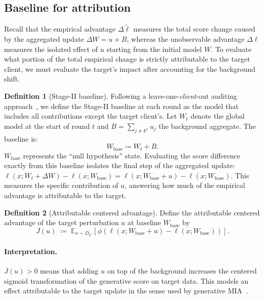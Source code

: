 \documentclass{article}
\theoremstyle{plain}
\theoremstyle{definition}
\newtheorem{definition}{Definition}
\theoremstyle{remark}
\numberwithin{theorem}{section}
\numberwithin{definition}{section}
\numberwithin{remark}{section}
\numberwithin{lemma}{section}
\numberwithin{assumption}{section}
\newcommand{\E}{\mathbb{E}}
\newcommand{\tindex}{k^\star}
\newcommand{\utarget}{u}
\begin{document}
\subsection{Baseline for attribution}

Recall that the empirical advantage $\Delta\tilde\ell$ measures the total score change caused by the aggregated update $\Delta W = \utarget + B$, whereas the unobservable advantage $\Delta\ell$ measures the isolated effect of $\utarget$ starting from the initial model $W$.
To evaluate what portion of the total empirical change is strictly attributable to the target client, we must evaluate the target's impact after accounting for the background shift.

\begin{definition}[Stage-II baseline]
\label{def:Wbase}
Following a leave-one-\emph{client}-out auditing approach~\cite{carlini2022membership}, we define the Stage-II baseline at each round as the model that includes all contributions except the target client's. Let $W_t$ denote the global model at the start of round $t$ and $B = \sum_{j \neq \tindex} u_j$ the background aggregate. The baseline is:
\begin{equation}
\label{eq:Wbase}
W_{\mathrm{base}} \coloneqq W_t + B.
\end{equation}
$W_{\mathrm{base}}$ represents the ``null hypothesis'' state. Evaluating the score difference exactly from this baseline isolates the final step of the aggregated update:
$ \ell(x; W_t + \Delta W) - \ell(x; W_{\mathrm{base}}) = \ell(x; W_{\mathrm{base}} + \utarget) - \ell(x; W_{\mathrm{base}}). $
This measures the specific contribution of $\utarget$, answering how much of the empirical advantage is attributable to the target.
\end{definition}

\begin{definition}[Attributable centered advantage]
\label{def:J}
Define the attributable centered advantage of the target perturbation $\utarget$ at baseline $W_{\mathrm{base}}$ by
\begin{equation}
\label{eq:J}
J(\utarget)
\;\coloneqq\;
\E_{x\sim D_{\tindex}}
\left[
\phi\!\left(\ell(x;W_{\mathrm{base}}+\utarget)-\ell(x;W_{\mathrm{base}})\right)
\right].
\end{equation}
\end{definition}

\paragraph{Interpretation.}
$J(\utarget)>0$ means that adding $\utarget$ on top of the background increases the centered sigmoid transformation of the generative score on target data.
This models an effect attributable to the target update in the sense used by generative MIA~\cite{Galende2025Membership}.
\end{document}
